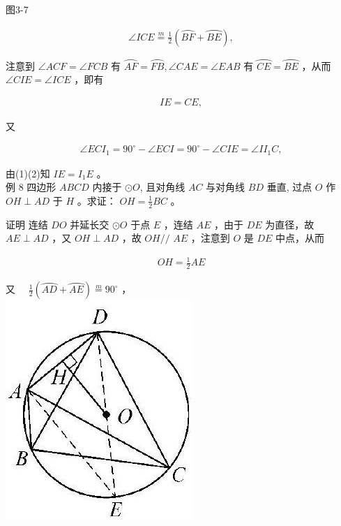 \documentclass[10pt]{article}
\begin{document}
图3-7

\begin{align*}
\angle I C E \stackrel{m}{=} \frac{1}{2}(\overparen{B F}+\overparen{B E}),
\end{align*}

注意到 $\angle A C F=\angle F C B$ 有 $\overparen{A F}=\overparen{F B}, \angle C A E=\angle E A B$ 有 $\overparen{C E}=\overparen{B E}$ ，从而 $\angle C I E=\angle I C E$ ，即有

\begin{align*}
I E=C E, \tag{1}
\end{align*}

又

\begin{align*}
\angle E C I_{1}=90^{\circ}-\angle E C I=90^{\circ}-\angle C I E=\angle I I_{1} C,
\end{align*}

由(1)(2)知 $I E=I_{1} E$ 。\\
例 8 四边形 $A B C D$ 内接于 $\odot O$, 且对角线 $A C$ 与对角线 $B D$ 垂直, 过点 $O$ 作 $O H \perp A D$ 于 $H$ 。求证： $O H=\frac{1}{2} B C$ 。

证明 连结 $D O$ 并延长交 $\odot O$ 于点 $E$ ，连结 $A E$ ，由于 $D E$ 为直径，故 $A E \perp A D$ ，又 $O H \perp A D$ ，故 $O H / /$ $A E$ ，注意到 $O$ 是 $D E$ 中点，从而

\begin{align*}
O H=\frac{1}{2} A E \tag{1}
\end{align*}

又 $\quad \frac{1}{2}(\overparen{A D}+\overparen{A E}) \stackrel{m}{=} 90^{\circ}$ ，\\
\includegraphics[max width=\textwidth, center]{2024_10_30_66b8e5e701da2093c133g-026}
\end{document}

